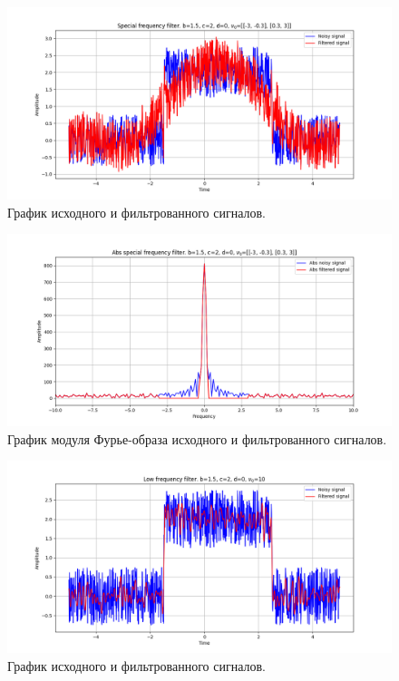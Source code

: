\documentclass[a4paper, 12pt]{article}
\begin{document}
    \begin{figure}[!htb]
        \centering
        \includegraphics[scale=0.485]{7_u_flt_u_nospec.png}
        \captionsetup{skip=0pt}
        \caption{График исходного и фильтрованного сигналов.}
        \label{fig:fig105}
    \end{figure}
    \begin{figure}[!htb]
        \centering
        \includegraphics[scale=0.485]{7_abs_u_U_nospec.png}
        \captionsetup{skip=0pt}
        \caption{График модуля Фурье-образа исходного и фильтрованного сигналов.}
        \label{fig:fig106}
    \end{figure}
    \begin{figure}[!htb]
        \centering
        \includegraphics[scale=0.485]{7_1_u_flt_u_nospec.png}
        \captionsetup{skip=0pt}
        \caption{График исходного и фильтрованного сигналов.}
        \label{fig:fig107}
    \end{figure}
\end{document}
